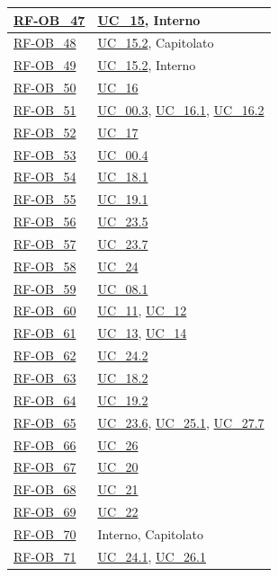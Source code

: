 \begin{longtable}{|>{\raggedright}p{}|>{\raggedright\arraybackslash}p{}|}
    \hyperlink{rf-ob_47}{RF-OB\_47} & \hyperref[uc_15]{UC\_15}, Interno \\ \hline
    \hyperlink{rf-ob_48}{RF-OB\_48} & \hyperref[uc_15.2]{UC\_15.2}, Capitolato \\ \hline
    \hyperlink{rf-ob_49}{RF-OB\_49} & \hyperref[uc_15.2]{UC\_15.2}, Interno \\ \hline
    \hyperlink{rf-ob_50}{RF-OB\_50} & \hyperref[uc_16]{UC\_16} \\ \hline
    \hyperlink{rf-ob_51}{RF-OB\_51} & \hyperref[uc_00.3]{UC\_00.3}, \hyperref[uc_16.1]{UC\_16.1}, \hyperref[uc_16.2]{UC\_16.2} \\ \hline
    \hyperlink{rf-ob_52}{RF-OB\_52} & \hyperref[uc_17]{UC\_17} \\ \hline
    \hyperlink{rf-ob_53}{RF-OB\_53} & \hyperref[uc_00.4]{UC\_00.4} \\ \hline
    \hyperlink{rf-ob_54}{RF-OB\_54} & \hyperref[uc_18.1]{UC\_18.1} \\ \hline
    \hyperlink{rf-ob_55}{RF-OB\_55} & \hyperref[uc_19.1]{UC\_19.1} \\ \hline
    \hyperlink{rf-ob_56}{RF-OB\_56} & \hyperref[uc_23.5]{UC\_23.5} \\ \hline
    \hyperlink{rf-ob_57}{RF-OB\_57} & \hyperref[uc_23.7]{UC\_23.7} \\ \hline
    \hyperlink{rf-ob_58}{RF-OB\_58} & \hyperref[uc_24]{UC\_24} \\ \hline
    \hyperlink{rf-ob_59}{RF-OB\_59} & \hyperref[uc_08.1]{UC\_08.1} \\ \hline
    \hyperlink{rf-ob_60}{RF-OB\_60} & \hyperref[uc_11]{UC\_11}, \hyperref[uc_12]{UC\_12} \\ \hline
    \hyperlink{rf-ob_61}{RF-OB\_61} & \hyperref[uc_13]{UC\_13}, \hyperref[uc_14]{UC\_14} \\ \hline
    \hyperlink{rf-ob_62}{RF-OB\_62} & \hyperref[uc_24.2]{UC\_24.2} \\ \hline
    \hyperlink{rf-ob_63}{RF-OB\_63} & \hyperref[uc_18.2]{UC\_18.2} \\ \hline
    \hyperlink{rf-ob_64}{RF-OB\_64} & \hyperref[uc_19.2]{UC\_19.2} \\ \hline
    \hyperlink{rf-ob_65}{RF-OB\_65} & \hyperref[uc_23.6]{UC\_23.6}, \hyperref[uc_25.1]{UC\_25.1}, \hyperref[uc_27.7]{UC\_27.7} \\ \hline
    \hyperlink{rf-ob_66}{RF-OB\_66} & \hyperref[uc_26]{UC\_26} \\ \hline
    \hyperlink{rf-ob_67}{RF-OB\_67} & \hyperref[uc_20]{UC\_20} \\ \hline
    \hyperlink{rf-ob_68}{RF-OB\_68} & \hyperref[uc_21]{UC\_21} \\ \hline
    \hyperlink{rf-ob_69}{RF-OB\_69} & \hyperref[uc_22]{UC\_22} \\ \hline
    \hyperlink{rf-ob_70}{RF-OB\_70} & Interno, Capitolato \\ \hline
    \hyperlink{rf-ob_71}{RF-OB\_71} & \hyperref[uc_24.1]{UC\_24.1}, \hyperref[uc_26.1]{UC\_26.1} \\ \hline
    

\end{longtable}
